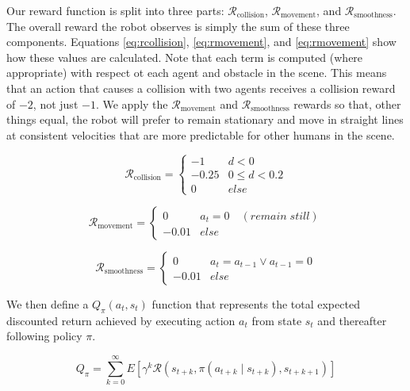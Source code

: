 \documentclass[letterpaper, 10 pt, conference]{ieeeconf}  %
\begin{document}
		Our reward function is split into three parts: $\mathcal{R}_{\text{collision}}$, $\mathcal{R}_{\text{movement}}$, and $\mathcal{R}_{\text{smoothness}}$. The overall reward the robot observes is simply the sum of these three components. Equations \ref{eq:rcollision}, \ref{eq:rmovement}, and \ref{eq:rmovement} show how these values are calculated. Note that each term is computed (where appropriate) with respect ot each agent and obstacle in the scene. This means that an action that causes a collision with two agents receives a collision reward of $-2$, not just $-1$. We apply the $\mathcal{R}_{\text{movement}}$ and $\mathcal{R}_{\text{smoothness}}$ rewards so that, other things equal, the robot will prefer to remain stationary and move in straight lines at consistent velocities that are more predictable for other humans in the scene.
		
		\begin{equation}\label{eq:rcollision}
			\mathcal{R}_{\text{collision}} = \begin{cases}
				-1      &   d < 0\\
				-0.25   &   0 \leq d < 0.2\\
				0       &   else
			\end{cases}
		\end{equation}
		
		\begin{equation}\label{eq:rmovement}
			\mathcal{R}_{\text{movement}} = \begin{cases}
			0       &   a_t = 0 \quad(remain\;still)\\
			-0.01   &   else
			\end{cases}
		\end{equation}
		
		\begin{equation}\label{eq:rsmoothness}
			\mathcal{R}_{\text{smoothness}} = \begin{cases}
			0       &   a_t = a_{t-1} \vee a_{t-1} = 0\\
			-0.01   &   else
			\end{cases}
		\end{equation}
		
		We then define a $Q_{\pi}(a_t, s_t)$ function that represents the total expected discounted return achieved by executing action $a_t$ from state $s_t$ and thereafter following policy $\pi$. 
		
		\begin{equation}\label{eq:q}
			Q_{\pi} = 
			\sum_{k=0}^{\infty}E[\gamma^k \mathcal{R}(s_{t+k}, \pi(a_{t+k} \mid s_{t+k}), s_{t+k+1})]
		\end{equation}
		
\end{document}
